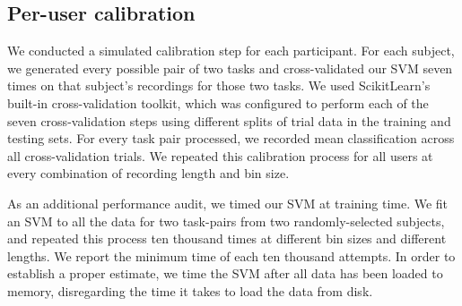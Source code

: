 \subsection{Per-user calibration}

We conducted a simulated calibration step for each participant. For each subject, we generated every possible pair of two tasks and cross-validated our SVM seven times on that subject's recordings for those two tasks. We used ScikitLearn's built-in cross-validation toolkit, which was configured to perform each of the seven cross-validation steps using different splits of trial data in the training and testing sets. For every task pair processed, we recorded mean classification across all cross-validation trials. We repeated this calibration process for all users at every combination of recording length and bin size. 

As an additional performance audit, we timed our SVM at training time. We fit an SVM to all the data for two task-pairs from two randomly-selected subjects, and repeated this process ten thousand times at different bin sizes and different lengths. We report the minimum time of each ten thousand attempts. In order to establish a proper estimate, we time the SVM after all data has been loaded to memory, disregarding the time it takes to load the data from disk.


